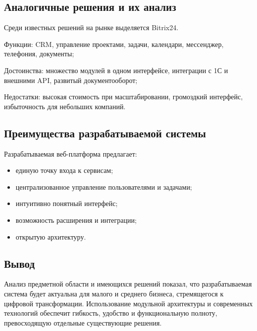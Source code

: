 \subsection{Аналогичные решения и их анализ}

Среди известных решений на рынке выделяется Bitrix24.

Функции: CRM, управление проектами, задачи, календари, мессенджер, телефония, документы;

Достоинства: множество модулей в одном интерфейсе, интеграции с 1С и внешними API, развитый документооборот;

Недостатки: высокая стоимость при масштабировании, громоздкий интерфейс, избыточность для небольших компаний.


\subsection{Преимущества разрабатываемой системы}

Разрабатываемая веб-платформа предлагает:

\begin{itemize}
  \item единую точку входа к сервисам;
  \item централизованное управление пользователями и задачами;
  \item интуитивно понятный интерфейс;
  \item возможность расширения и интеграции;
  \item открытую архитектуру.
\end{itemize}

\subsection{Вывод}

Анализ предметной области и имеющихся решений показал, что разрабатываемая система будет актуальна для малого и среднего бизнеса, стремящегося к цифровой трансформации. Использование модульной архитектуры и современных технологий обеспечит гибкость, удобство и функциональную полноту, превосходящую отдельные существующие решения.